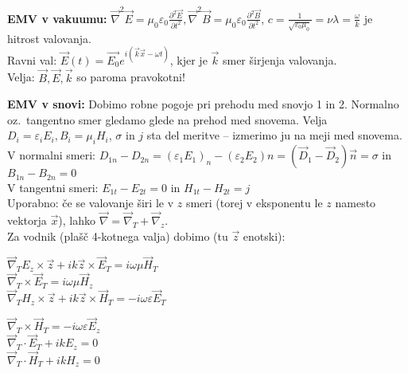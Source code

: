 \documentclass[a4paper, oneside, 12pt]{article}
\theoremstyle{definition}
\newcommand{\vv}{\vec}
\newcommand{\vE}{\ensuremath{\vec{E}}}
\newcommand{\vB}{\ensuremath{\vec{B}}}
\newcommand{\vD}{\ensuremath{\vec{D}}}
\newcommand{\vH}{\ensuremath{\vec{H}}}
\newcommand{\vnabla}{\ensuremath{\vec{\nabla}}}
\newcommand{\eps}{\varepsilon}
\newcommand{\x}{\times}
\begin{document}
\textbf{EMV v vakuumu:} $\vnabla^2 \vE = \mu_0 \eps_0 \frac{\partial^2 \vE}{\partial t^2},
\vnabla^2 \vB = \mu_0 \eps_0 \frac{\partial^2 \vB}{\partial t^2}$,
$c = \frac{1}{\sqrt{\eps_0 \mu_0}} = \nu \lambda = \frac{\omega}{k}$ je hitrost valovanja.\\
Ravni val: $\vE(t) = \vv{E_0} e^{i(\vv{k} \vv{x} - \omega t)}$, kjer je $\vv{k}$ smer širjenja valovanja.\\
Velja: $\vB, \vE, \vv{k}$ so paroma pravokotni!

\textbf{EMV v snovi:} Dobimo robne pogoje pri prehodu med snovjo 1 in 2.
Normalno oz.\ tangentno smer gledamo glede na prehod med snovema.
Velja $D_i = \eps_i E_i, B_i = \mu_i H_i$, $\sigma$ in $j$ sta del
meritve -- izmerimo ju na meji med snovema.\\
V normalni smeri: $D_{1 n} - D_{2 n} = (\eps_1 E_1)_n - (\eps_2 E_2)n=
(\vD_1 - \vD_2) \vv{n} = \sigma$ in $B_{1 n} - B_{2 n} = 0$\\
V tangentni smeri: $E_{1 t} - E_{2 t} = 0$ in $H_{1 t} - H_{2 t} = j$\\
Uporabno: če se valovanje širi le v $z$ smeri (torej v eksponentu le $z$
namesto vektorja $\vv{x}$), lahko $\vnabla = \vnabla_T + \vnabla_z$.\\
Za vodnik (plašč 4-kotnega valja) dobimo (tu $\vv{z}$ enotski):\\
\parbox{0.5\textwidth}{
$\vnabla_T E_z \x \vv{z} + i k \vv{z} \x \vE_T = i \omega \mu \vH_T$\\
$\vnabla_T \x \vE_T = i \omega \mu \vH_z$\\
$\vnabla_T H_z \x \vv{z} + i k \vv{z} \x \vH_T = - i \omega \eps \vE_T$}
\parbox{0.5\textwidth}{
$\vnabla_T \x \vH_T = - i \omega \eps \vE_z$\\
$\vnabla_T \cdot \vE_T + ik E_z = 0$\\
$\vnabla_T \cdot \vH_T + i k H_z = 0$ }
\end{document}

